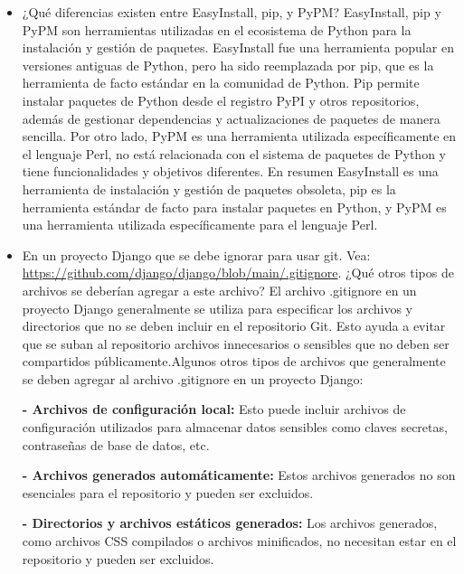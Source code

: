 \documentclass{article}
\begin{document}
\begin{itemize}
		\item{¿Qué diferencias existen entre EasyInstall, pip, y PyPM?}\newline
    EasyInstall, pip y PyPM son herramientas utilizadas en el ecosistema de Python para la instalación y gestión de paquetes. EasyInstall fue una herramienta popular en versiones antiguas de Python, pero ha sido reemplazada por pip, que es la herramienta de facto estándar en la comunidad de Python. Pip permite instalar paquetes de Python desde el registro PyPI y otros repositorios, además de gestionar dependencias y actualizaciones de paquetes de manera sencilla. Por otro lado, PyPM es una herramienta utilizada específicamente en el lenguaje Perl, no está relacionada con el sistema de paquetes de Python y tiene funcionalidades y objetivos diferentes.\newline
    En resumen EasyInstall es una herramienta de instalación y gestión de paquetes obsoleta, pip es la herramienta estándar de facto para instalar paquetes en Python, y PyPM es una herramienta utilizada específicamente para el lenguaje Perl.\newline

\item{En un proyecto Django que se debe ignorar para usar git. Vea: \url{https://github.com/django/django/blob/main/.gitignore}. ¿Qué otros tipos de archivos se deberían agregar a este archivo?}\newline
  El archivo .gitignore en un proyecto Django generalmente se utiliza para especificar los archivos y directorios que no se deben incluir en el repositorio Git. Esto ayuda a evitar que se suban al repositorio archivos innecesarios o sensibles que no deben ser compartidos públicamente.Algunos otros tipos de archivos que generalmente se deben agregar al archivo .gitignore en un proyecto Django:\newline

\textbf{- Archivos de configuración local:} Esto puede incluir archivos de configuración utilizados para almacenar datos sensibles como claves secretas, contraseñas de base de datos, etc.\newline 

\textbf{- Archivos generados automáticamente: }Estos archivos generados no son esenciales para el repositorio y pueden ser excluidos. \newline

\textbf{- Directorios y archivos estáticos generados: }Los archivos generados, como archivos CSS compilados o archivos minificados, no necesitan estar en el repositorio y pueden ser excluidos. \newline


\end{itemize}
\end{document}

